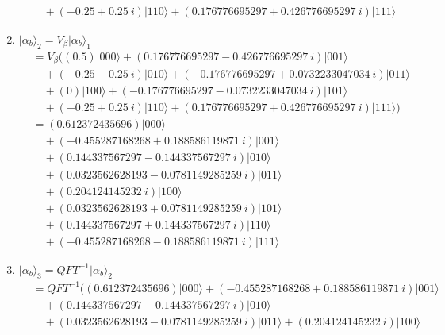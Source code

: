 \begin{example}
\begin{enumerate}
\begin{align*}
			& \quad + \left( -0.25 + 0.25\ i \right) \vert 110 \rangle + \left( 0.176776695297 + 0.426776695297\ i \right) \vert 111 \rangle
		\end{align*}
	\item $\vert \alpha_{b} \rangle_2 = V_\beta \vert \alpha_{b} \rangle_1$
		\begin{align*}
			&= V_\beta \Big( \left( 0.5 \right) \vert 000 \rangle + \left( 0.176776695297 - 0.426776695297\ i \right) \vert 001 \rangle\\
			& \quad + \left( -0.25 - 0.25\ i \right) \vert 010 \rangle + \left( -0.176776695297 + 0.0732233047034\ i \right) \vert 011 \rangle\\
			& \quad + \left( 0 \right) \vert 100 \rangle + \left( -0.176776695297 - 0.0732233047034\ i \right) \vert 101 \rangle\\
			& \quad + \left( -0.25 + 0.25\ i \right) \vert 110 \rangle + \left( 0.176776695297 + 0.426776695297\ i \right) \vert 111 \rangle \Big)\\
			&= \left( 0.612372435696 \right) \vert 000 \rangle \\
			& \quad + \left( -0.455287168268 + 0.188586119871\ i \right) \vert 001 \rangle \\
			& \quad + \left( 0.144337567297 - 0.144337567297\ i \right) \vert 010 \rangle \\
			& \quad + \left( 0.0323562628193 - 0.0781149285259\ i  \right) \vert 011 \rangle \\
			& \quad + \left( 0.204124145232\ i \right) \vert 100 \rangle \\
			& \quad + \left( 0.0323562628193 + 0.0781149285259\ i  \right) \vert 101 \rangle\\
			& \quad + \left( 0.144337567297 + 0.144337567297\ i \right) \vert 110 \rangle \\
			& \quad + \left( -0.455287168268 - 0.188586119871\ i \right) \vert 111 \rangle 
		\end{align*}
	\item $\vert \alpha_{b} \rangle_3 = QFT^{-1}\vert \alpha_{b} \rangle_2$
		\begin{align*}
			&= QFT^{-1}\Big( \left( 0.612372435696 \right) \vert 000 \rangle + \left( -0.455287168268 + 0.188586119871\ i \right) \vert 001 \rangle \\
			& \quad + \left( 0.144337567297 - 0.144337567297\ i \right) \vert 010 \rangle \\
			& \quad + \left( 0.0323562628193 - 0.0781149285259\ i  \right) \vert 011 \rangle + \left( 0.204124145232\ i \right) \vert 100 \rangle \\

\end{align*}
\end{enumerate}
\end{example}
